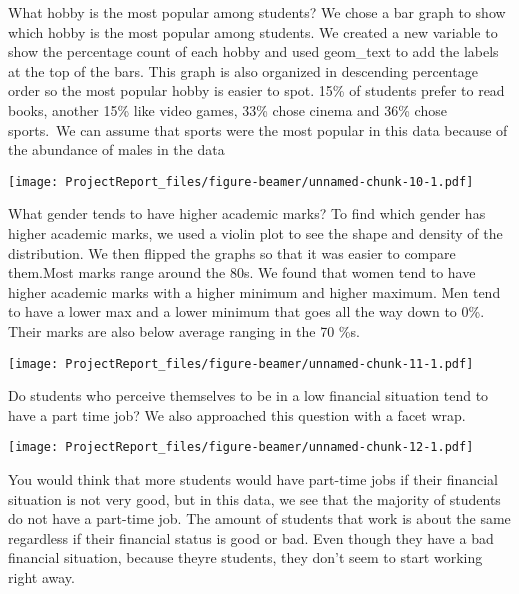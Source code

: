 \documentclass[
  ignorenonframetext,
]{beamer}
\begin{document}
\begin{frame}{What hobby is the most popular among students?}
\protect\hypertarget{what-hobby-is-the-most-popular-among-students}{}
We chose a bar graph to show which hobby is the most popular among
students. We created a new variable to show the percentage count of each
hobby and used geom\_text to add the labels at the top of the bars. This
graph is also organized in descending percentage order so the most
popular hobby is easier to spot. 15\% of students prefer to read books,
another 15\% like video games, 33\% chose cinema and 36\% chose
sports.~We can assume that sports were the most popular in this data
because of the abundance of males in the data

\texttt{[image: ProjectReport\_files/figure-beamer/unnamed-chunk-10-1.pdf]}
\end{frame}

\begin{frame}{What gender tends to have higher academic marks?}
\protect\hypertarget{what-gender-tends-to-have-higher-academic-marks}{}
To find which gender has higher academic marks, we used a violin plot to
see the shape and density of the distribution. We then flipped the
graphs so that it was easier to compare them.Most marks range around the
80\textquotesingle s. We found that women tend to have higher academic
marks with a higher minimum and higher maximum. Men tend to have a lower
max and a lower minimum that goes all the way down to 0\%. Their marks
are also below average ranging in the 70 \%s.

\texttt{[image: ProjectReport\_files/figure-beamer/unnamed-chunk-11-1.pdf]}
\end{frame}

\begin{frame}{Do students who perceive themselves to be in a low
financial situation tend to have a part time job?}
\protect\hypertarget{do-students-who-perceive-themselves-to-be-in-a-low-financial-situation-tend-to-have-a-part-time-job}{}
We also approached this question with a facet wrap.

\texttt{[image: ProjectReport\_files/figure-beamer/unnamed-chunk-12-1.pdf]}

You would think that more students would have part-time jobs if their
financial situation is not very good, but in this data, we see that the
majority of students do not have a part-time job. The amount of students
that work is about the same regardless if their financial status is good
or bad. Even though they have a bad financial situation, because
they\textquotesingle re students, they don't seem to start working right
away.
\end{frame}
\end{document}

